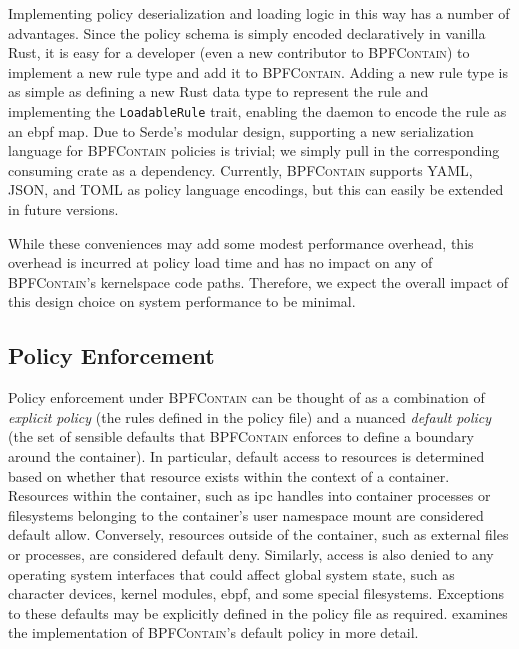 \documentclass[
  fontsize=12pt,
  titlepage=firstiscover,
  paper=letter,
oneside,
  cleardoublepage=plain,
  parskip=half-,
  DIV=10,
  parindent,
  appendixprefix,
  chapterprefix,
  listof=totoc,
]{scrbook}
\newcommand{\bpfcontain}{\textsc{BPFContain}}
\begin{document}
Implementing policy deserialization and loading logic in this way has a number of
advantages. Since the policy schema is simply encoded declaratively in vanilla Rust, it is
easy for a developer (even a new contributor to \bpfcontain{}) to implement a new rule
type and add it to \bpfcontain{}. Adding a new rule type is as simple as defining a new
Rust data type to represent the rule and implementing the \texttt{LoadableRule} trait,
enabling the daemon to encode the rule as an \gls{ebpf} map. Due to Serde's modular
design, supporting a new serialization language for \bpfcontain{} policies is trivial; we
simply pull in the corresponding consuming crate as a dependency. Currently, \bpfcontain{}
supports YAML, JSON, and TOML as policy language encodings, but this can easily be
extended in future versions.

While these conveniences may add some modest performance overhead, this overhead is
incurred at policy load time and has no impact on any of \bpfcontain{}'s kernelspace code
paths. Therefore, we expect the overall impact of this design choice on system
performance to be minimal.

\subsection{Policy Enforcement}\label{ss:bpfcontain-enforcement}

Policy enforcement under \bpfcontain{} can be thought of as a combination of
\textit{explicit policy} (the rules defined in the policy file) and a nuanced
\textit{default policy} (the set of sensible defaults that \bpfcontain{} enforces to
define a boundary around the container). In particular, default access to resources is
determined based on whether that resource exists within the context of a container.
Resources within the container, such as \gls{ipc} handles into container processes or
filesystems belonging to the container's user namespace mount are considered
default allow. Conversely, resources outside of the container, such as external files or
processes, are considered default deny. Similarly, access is also denied to any operating
system interfaces that could affect global system state, such as character devices, kernel
modules, \gls{ebpf}, and some special filesystems. Exceptions to these defaults may
be explicitly defined in the policy file as required. 
examines the implementation of \bpfcontain{}'s default policy in more detail.
\end{document}
